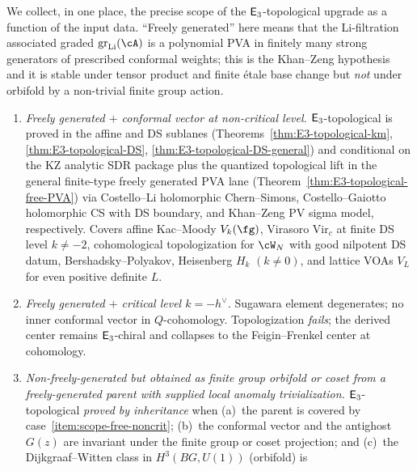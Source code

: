 \begin{remark}
\label{rem:e3-topological-scope-map}
We collect, in one place, the precise scope of the
$\mathsf{E}_3$-topological upgrade as a function of the input data.
``Freely generated'' here means that the Li-filtration associated
graded $\operatorname{gr}_{\mathrm{Li}}(\cA)$ is a polynomial PVA in
finitely many strong generators of prescribed conformal weights;
this is the Khan--Zeng hypothesis~\cite[\S 3]{KZ25} and it is
stable under tensor product and finite \'etale base change but
\emph{not} under orbifold by a non-trivial finite group action.
\begin{enumerate}[label=\textup{(\arabic*)}]
\item\label{item:scope-free-noncrit}
 \emph{Freely generated $+$ conformal vector at non-critical level.}
 $\mathsf{E}_3$-topological is proved in the affine and DS sublanes
 \textup{(}Theorems~\ref{thm:E3-topological-km},
 \ref{thm:E3-topological-DS},
 \ref{thm:E3-topological-DS-general}\textup{)} and conditional on the
 KZ analytic SDR package plus the quantized topological lift in the
 general finite-type freely generated PVA lane
 \textup{(}Theorem~\ref{thm:E3-topological-free-PVA}\textup{)} via Costello--Li
 holomorphic Chern--Simons, Costello--Gaiotto holomorphic CS with
 DS boundary, and Khan--Zeng PV sigma model, respectively.
 Covers affine Kac--Moody $V_k(\fg)$, Virasoro $\mathrm{Vir}_c$ at
 finite DS level $k\ne -2$, cohomological topologization for
 $\cW_N$ with good nilpotent DS datum, Bershadsky--Polyakov,
 Heisenberg $H_k$ $(k \neq 0)$, and lattice VOAs $V_L$ for even positive
 definite $L$.
\item\label{item:scope-free-crit}
 \emph{Freely generated $+$ critical level
 $k = -h^{\vee}$.}
 Sugawara element degenerates; no inner conformal vector
 in $Q$-cohomology. Topologization \emph{fails}; the derived
 center remains $\mathsf{E}_3$-chiral and collapses to the
 Feigin--Frenkel center at cohomology.
\item\label{item:scope-orbifold}
 \emph{Non-freely-generated but obtained as finite group orbifold or
 coset from a freely-generated parent with supplied local anomaly
 trivialization.} $\mathsf{E}_3$-topological \emph{proved by inheritance}
 when (a)~the parent is covered by case~\ref{item:scope-free-noncrit};
 (b)~the conformal vector and the antighost~$G(z)$ are invariant
 under the finite group or coset projection; and (c)~the
 Dijkgraaf--Witten class in $H^3(BG, U(1))$ (orbifold) is

\end{enumerate}
\end{remark}
